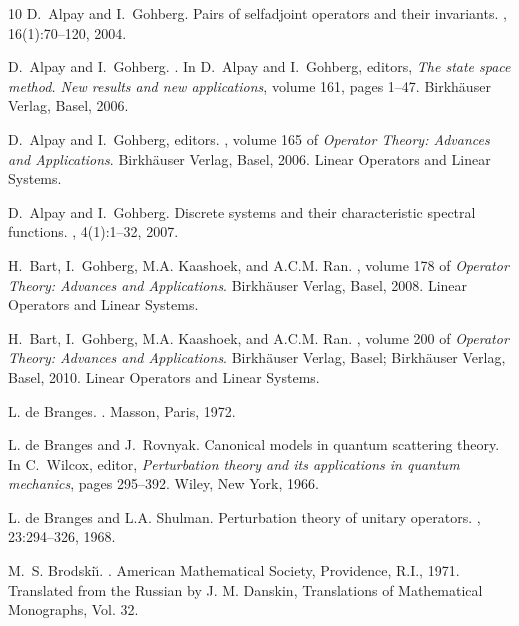 \documentclass[12pt]{amsart}
\theoremstyle{definition}
\theoremstyle{remark}
\numberwithin{equation}{section}
\begin{document}
\begin{thebibliography}{10}
D.~Alpay and I.~Gohberg.
\newblock Pairs of selfadjoint operators and their invariants.
, 16(1):70--120, 2004.

D.~Alpay and I.~Gohberg.
.
\newblock In D.~Alpay and I.~Gohberg, editors, {\em {The state space method.
  New results and new applications}}, volume 161, pages 1--47. Birkh{\" a}user
  Verlag, Basel, 2006.

D.~Alpay and I.~Gohberg, editors.
, volume
  165 of {\em Operator Theory: Advances and Applications}.
\newblock Birkh\"auser Verlag, Basel, 2006.
\newblock Linear Operators and Linear Systems.

D.~Alpay and I.~Gohberg.
\newblock Discrete systems and their characteristic spectral functions.
, 4(1):1--32, 2007.

H.~Bart, I.~Gohberg, M.A. Kaashoek, and A.C.M. Ran.
, volume 178 of {\em Operator Theory: Advances and Applications}.
\newblock Birkh\"auser Verlag, Basel, 2008.
\newblock Linear Operators and Linear Systems.

H.~Bart, I.~Gohberg, M.A. Kaashoek, and A.C.M. Ran.
, volume 200 of {\em Operator Theory: Advances and
  Applications}.
\newblock Birkh\"auser Verlag, Basel; Birkh\"auser Verlag, Basel, 2010.
\newblock Linear Operators and Linear Systems.

{L. de} Branges.
.
\newblock Masson, {P}aris, 1972.

{L. de} Branges and J.~Rovnyak.
\newblock Canonical models in quantum scattering theory.
\newblock In C.~Wilcox, editor, {\em Perturbation theory and its applications
  in quantum mechanics}, pages 295--392. Wiley, {N}ew {Y}ork, 1966.

{L. de} Branges and L.A. Shulman.
\newblock Perturbation theory of unitary operators.
, 23:294--326, 1968.

M.~S. Brodski{\u\i}.
.
\newblock American Mathematical Society, Providence, R.I., 1971.
\newblock Translated from the Russian by J. M. Danskin, Translations of
  Mathematical Monographs, Vol. 32.


\end{thebibliography}
\end{document}
